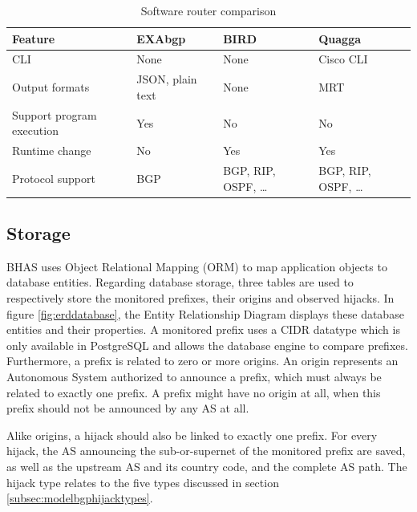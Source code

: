 \par

\begin{table}[]
\centering
\begin{tabular}{|l|l|l|l|}
    \hline
    \textbf{Feature}                   & \textbf{EXAbgp}\cite{exabgp}  & \textbf{BIRD}\cite{bird} & \textbf{Quagga}\cite{quagga} \\ \hline
    CLI                                & None             & None                      & Cisco CLI       \\ \hline
    Output formats                     & JSON, plain text & None                      & MRT             \\ \hline
    Support program execution          & Yes              & No                        & No              \\ \hline
    Runtime change                     & No               & Yes                       & Yes             \\ \hline
    Protocol support                   & BGP              & BGP, RIP, OSPF, \ldots    & BGP, RIP, OSPF, \ldots             \\ \hline
\end{tabular}
\caption{Software router comparison}
\label{table:softwarerouter}
\end{table}

\subsection{Storage}\label{subsec:bhasstorage}
BHAS uses Object Relational Mapping (ORM) to map application objects to database entities. Regarding database storage, three tables are used to respectively store the monitored prefixes, their origins and observed hijacks. In figure \ref{fig:erddatabase}, the Entity Relationship Diagram displays these database entities and their properties. A monitored prefix uses a CIDR datatype which is only available in PostgreSQL and allows the database engine to compare prefixes\cite{postgresqlcidr}. Furthermore, a prefix is related to zero or more origins. An origin represents an Autonomous System authorized to announce a prefix, which must always be related to exactly one prefix. A prefix might have no origin at all, when this prefix should not be announced by any AS at all.\par
Alike origins, a hijack should also be linked to exactly one prefix. For every hijack, the AS announcing the sub-or-supernet of the monitored prefix are saved, as well as the upstream AS and its country code, and the complete AS path. The hijack type relates to the five types discussed in section \ref{subsec:modelbgphijacktypes}.

